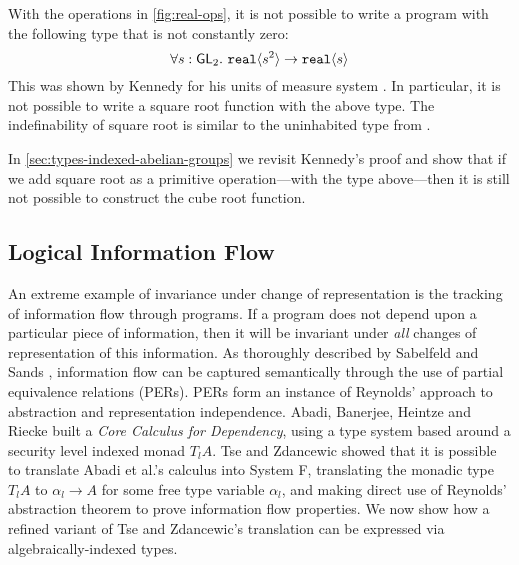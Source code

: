 \begin{example}
  With the operations in \autoref{fig:real-ops}, it is not possible to
  write a program with the following type that is not constantly zero:
  \begin{displaymath}
    \forall s : \mathsf{GL}_2.\ \texttt{real}\langle s^2 \rangle \to \texttt{real}\langle s \rangle
  \end{displaymath}
  This was shown by Kennedy for his units of measure system
  \cite{kennedy97relational}.  In particular, it is not possible to
  write a square root function with the above type. The indefinability
  of square root is similar to the uninhabited type from
  .

  In \autoref{sec:types-indexed-abelian-groups} we revisit Kennedy's
  proof and show that if we add square root as a primitive
  operation---with the type above---then it is still not possible to
  construct the cube root function.
\end{example}

\subsection{Logical Information Flow}
\label{sec:information-flow}

An extreme example of invariance under change of representation is the
tracking of information flow through programs. If a program does not
depend upon a particular piece of information, then it will be
invariant under \emph{all} changes of representation of this
information. As thoroughly described by Sabelfeld and Sands
\cite{sabelfeld01per}, information flow can be captured semantically
through the use of partial equivalence relations (PERs). PERs form an
instance of Reynolds' approach to abstraction and representation
independence. Abadi, Banerjee, Heintze and Riecke \cite{abadi99core}
built a \emph{Core Calculus for Dependency}, using a type system based
around a security level indexed monad $T_lA$. Tse and Zdancewic
\cite{tse04translating} showed that it is possible to translate Abadi
et al.'s calculus into System F, translating the monadic type $T_lA$
to $\alpha_l \to A$ for some free type variable $\alpha_l$, and making
direct use of Reynolds' abstraction theorem to prove information flow
properties. We now show how a refined variant of Tse and Zdancewic's
translation can be expressed via algebraically-indexed types.

